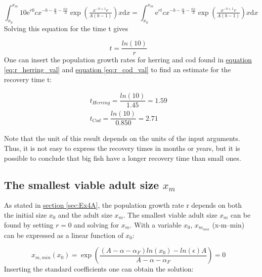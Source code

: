 \documentclass{article}
\numberwithin{equation}{section} %
\newcommand{\me}{\mathrm{e}}
\newcommand{\md}{\mathrm{d}}
\begin{document}
\begin{equation}
	\int_{x_0}^{x_m}10\me^{r0}cx^{-b-\tfrac{\alpha}{A}-\tfrac{\alpha_F}{A}}\exp\left(\tfrac{x^{-b+1}r}{A(b-1)}\right)x\md x = \int_{x_0}^{x_m}\me^{rt}cx^{-b-\tfrac{\alpha}{A}-\tfrac{\alpha_F}{A}}\exp\left(\tfrac{x^{-b+1}r}{A(b-1)}\right)x\md x
\end{equation}
Solving this equation for the time t gives

\begin{equation}\label{eq:solvet}
	t = \dfrac{ln(10)}{r}
\end{equation}
One can insert the population growth rates for herring and cod found in \hyperref[eq:r_herring_val]{equation \ref{eq:r_herring_val}} and \hyperref[eq:r_cod_val]{equation \ref{eq:r_cod_val}} to find an estimate for the recovery time t:

\begin{align}
    t_{Herring} = \dfrac{ln(10)}{1.45} = 1.59\\
    t_{Cod} = \dfrac{ln(10)}{0.850} = 2.71
\end{align}

Note that the unit of this result depends on the units of the input arguments. Thus, it is not easy to express the recovery times in months or years, but it is possible to conclude that big fish have a longer recovery time than small ones.

\subsection{The smallest viable adult size $x_m$}\label{sec:Ex4B}
As stated in \hyperref[sec:Ex4A]{section \ref{sec:Ex4A}}, the population growth rate r depends on both the initial size $x_0$ and the adult size $x_m$. The smallest viable adult size $x_m$ can be found by setting $r=0$ and solving for $x_m$. With a variable $x_0$, $x_{m_{min}}$ (x-m--min) can be expressed as a linear function of $x_0$:

\begin{equation}\label{eq:req0_1}
	x_{m,min}(x_0)=\exp\left(\dfrac{(A-\alpha-\alpha_F)ln(x_0)-ln(\epsilon)A}{A-\alpha-\alpha_F}\right)=0
\end{equation}
Inserting the standard coefficients one can obtain the solution:
\end{document}
